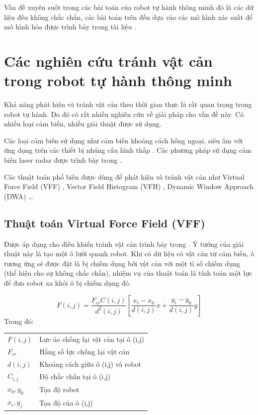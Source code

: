 Vấn đề xuyên suốt trong các bài toán của robot tự hành thông minh đó là các dữ liệu đều không chắc chắn, các bài toán trên đều dựa vào các mô hình xác suất để mô hình hóa được trình bày trong tài liệu \cite{Sebastian2005}.


\section{Các nghiên cứu tránh vật cản trong robot tự hành thông minh}
\label{sec:tranhVatCan_ref}

Khả năng phát hiện và tránh vật cản theo thời gian thực là rất quan trọng trong robot tự hành. Do đó có rất nhiều nghiên cứu về giải pháp cho vấn đề này. Có nhiều loại cảm biến, nhiều giải thuật được sử dụng.

Các loại cảm biến sử dụng như cảm biến khoảng cách hồng ngoại, siêu âm với ứng dụng trên các thiết bị nhúng cấu hình thấp \cite{dongyue2013, Susnea2009}. Các phương pháp sử dụng cảm biến laser radar được trình bày trong \cite{Gao2019, Wu2015, Peng2015,Baras2019}.

Các thuật toán phổ biến được dùng để phát hiện và tránh vật cản như Virtual Force Field (VFF) \cite{Borenstein1989}, Vector Field Histogram (VFH) \cite{Borenstein1991}, Dynamic Window Approach (DWA) \cite{Fox1997}\ldots

\subsection{Thuật toán Virtual Force Field (VFF)}

Được áp dụng cho điều khiển tránh vật cản trình bày trong \cite{Borenstein1988,Borenstein1989}. Ý tưởng của giải thuật này là tạo một ô lưới quanh robot. Khi có dữ liệu có vật cản từ cảm biến, ô tương ứng sẽ được đặt là bị chiếm dụng bởi vật cản với một tỉ số chiếm dụng (thể hiện cho sự không chắc chắn), nhiệm vụ của thuật toán là tính toán một lực để đưa robot xa khỏi ô bị chiếm dụng đó.


\begin{equation}
  F(i,j) = \frac{{F}_{cr}C(i,j)}{{d}^{2}(i,j)}\left [\frac{{x}_{t}-{x}_{0}}{d(i,j)}\dot{x} + \frac{{y}_{t}-{y}_{0}}{d(i,j)}\dot{y}
  \right ]
\end{equation}
Trong đó:

\begin{tabular}{ll}
  $F(i,j)$      & Lực ảo chống lại vật cản tại ô (i,j) \\
  ${F}_{cr}$    & Hằng số lực chống lại vật cản  \\
  $d(i,j)$      & Khoảng cách giữa ô (i,j) và robot \\
  ${C}_{i,j}$   & Độ chắc chắn tại ô (i,j)  \\
  ${x}_{0}, {y}_{0}$ & Tọa độ robot \\
  ${x}_{i}, {y}_{j}$ & Tọa độ của ô (i,j)
\end{tabular}

